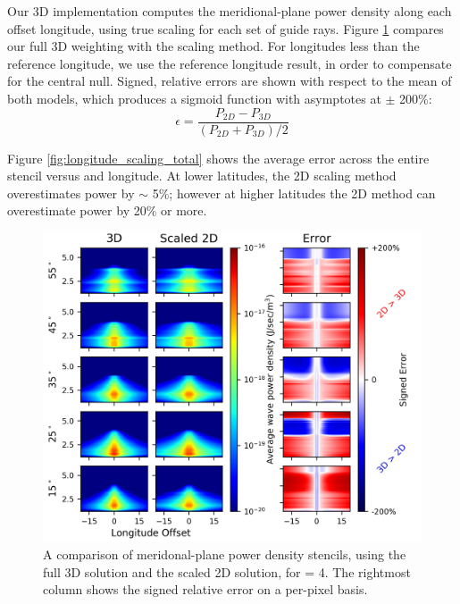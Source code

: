 Our 3D implementation computes the meridional-plane power density along each offset longitude, using true scaling for each set of guide rays. Figure \ref{fig:longitude_scaling_2d_vs_3d} compares our full 3D weighting with the \cite{Bortnik2005} scaling method. For longitudes less than the reference longitude, we use the reference longitude result, in order to compensate for the central null. Signed, relative errors are shown with respect to the mean of both models, which produces a sigmoid function with asymptotes at $\pm$ 200\%:
\begin{equation}
\epsilon = \frac{P_{2D} - P_{3D}}{(P_{2D} + P_{3D})/2}
\end{equation}

Figure \ref{fig:longitude_scaling_total} shows the average error across the entire stencil versus \kp{} and longitude. At lower latitudes, the 2D scaling method overestimates power by $\sim$ 5\%; however at higher latitudes the 2D method can overestimate power by 20\% or more.
\begin{figure}[h!]
\begin{center}
\includegraphics{figures/rel_error_grid_2d3d.png}
\caption[Difference between 2d and 3d longitude scaling]{A comparison of meridonal-plane power density stencils, using the full 3D solution and the scaled 2D solution, for \kp{} = 4. The rightmost column shows the signed relative error on a per-pixel basis.}
\label{fig:longitude_scaling_2d_vs_3d}
\end{center}
\end{figure}

